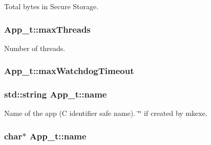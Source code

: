 Total bytes in Secure Storage. 

\subsubsection[{\texorpdfstring{max\+Threads}{maxThreads}}]{ App\+\_\+t\+::max\+Threads}\hypertarget{struct_app__t_a76ee0a3f3570f14447e4f68a94fd0e9f}{}\label{struct_app__t_a76ee0a3f3570f14447e4f68a94fd0e9f}


Number of threads. 

\subsubsection[{\texorpdfstring{max\+Watchdog\+Timeout}{maxWatchdogTimeout}}]{ App\+\_\+t\+::max\+Watchdog\+Timeout}\hypertarget{struct_app__t_ae7e819b81e7412e4b34afa3ec466edd1}{}\label{struct_app__t_ae7e819b81e7412e4b34afa3ec466edd1}
\subsubsection[{\texorpdfstring{name}{name}}]{\setlength{\rightskip}{0pt plus 5cm}std\+::string App\+\_\+t\+::name}\hypertarget{struct_app__t_a35a67dd44bf6e0d4f5ca77b5d19fc714}{}\label{struct_app__t_a35a67dd44bf6e0d4f5ca77b5d19fc714}


Name of the app (C identifier safe name). \char`\"{}\char`\"{} if created by mkexe. 

\subsubsection[{\texorpdfstring{name}{name}}]{\setlength{\rightskip}{0pt plus 5cm}char$\ast$ App\+\_\+t\+::name}\hypertarget{struct_app__t_a689991ebd41e9ef9d7a467afef65e71b}{}\label{struct_app__t_a689991ebd41e9ef9d7a467afef65e71b}
